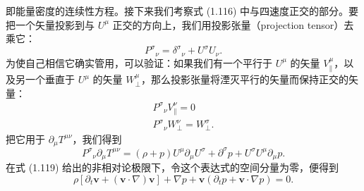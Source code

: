 即能量密度的连续性方程。接下来我们考察式 (1.116) 中与四速度正交的部分。要把一个矢量投影到与 $U^{\mu}$ 正交的方向上，我们用投影张量（projection tensor）去乘它：
\begin{equation*}
P^{\sigma}{}_{\nu} = \delta^{\sigma}{}_{\nu} + U^{\sigma}U_{\nu}.
\tag{1.121}
\end{equation*}
为使自己相信它确实管用，可以验证：如果我们有一个平行于 $U^{\mu}$ 的矢量 $V^{\mu}_{\parallel}$，以及另一个垂直于 $U^{\mu}$ 的矢量 $W^{\mu}_{\perp}$，那么投影张量将湮灭平行的矢量而保持正交的矢量：
\begin{equation*}
\begin{gathered}
P^{\sigma}{}_{\nu}V^{\nu}_{\parallel} = 0\\
P^{\sigma}{}_{\nu}W^{\nu}_{\perp} = W^{\sigma}_{\perp}.
\end{gathered}
\tag{1.122}
\end{equation*}
把它用于 $\partial_{\mu}T^{\mu\nu}$，我们得到
\begin{equation*}
P^{\sigma}{}_{\nu}\partial_{\mu}T^{\mu\nu} = (\rho+p)U^{\mu}\partial_{\mu}U^{\sigma} + \partial^{\sigma}p + U^{\sigma}U^{\mu}\partial_{\mu}p.
\tag{1.123}
\end{equation*}
在式 (1.119) 给出的非相对论极限下，令这个表达式的空间分量为零，便得到
\begin{equation*}
\rho\left[\partial_t\mathbf{v} + (\mathbf{v}\cdot\nabla)\mathbf{v}\right] + \nabla p + \mathbf{v}(\partial_t p + \mathbf{v}\cdot\nabla p) = 0.
\tag{1.124}
\end{equation*}

